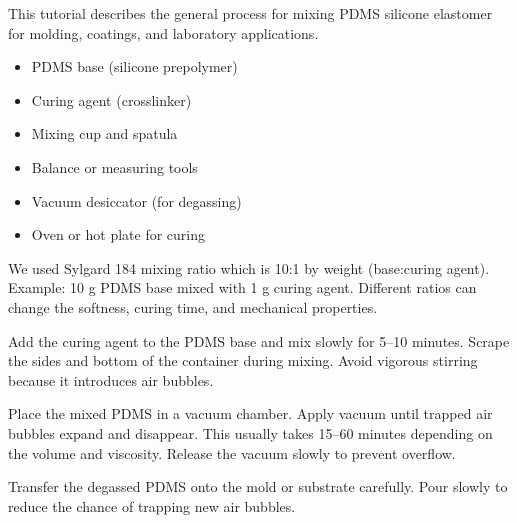 
\clearpage
\hypertarget{q4-pdms-mixing-tutorial}{}

\begingroup
\fontsize{9.0}{10.45}\selectfont
\newcommand{\pdmshead}[1]{\par\vspace{0.48em}{\bfseries #1}\par\vspace{0.15em}}

This tutorial describes the general process for mixing PDMS silicone elastomer
for molding, coatings, and laboratory applications.

\pdmshead{Materials}
\begin{itemize}[leftmargin=1.45em,itemsep=0.15em,topsep=0.25em]
  \item PDMS base (silicone prepolymer)
  \item Curing agent (crosslinker)
  \item Mixing cup and spatula
  \item Balance or measuring tools
  \item Vacuum desiccator (for degassing)
  \item Oven or hot plate for curing
\end{itemize}

\pdmshead{Step 1: Measure the Components}
We used Sylgard 184 mixing ratio which is 10:1 by weight (base:curing agent).
Example: 10 g PDMS base mixed with 1 g curing agent. Different ratios can change
the softness, curing time, and mechanical properties.

\pdmshead{Step 2: Mix Thoroughly}
Add the curing agent to the PDMS base and mix slowly for 5--10 minutes. Scrape
the sides and bottom of the container during mixing. Avoid vigorous stirring
because it introduces air bubbles.

\pdmshead{Step 3: Degas the PDMS}
Place the mixed PDMS in a vacuum chamber. Apply vacuum until trapped air bubbles
expand and disappear. This usually takes 15--60 minutes depending on the volume
and viscosity. Release the vacuum slowly to prevent overflow.

\pdmshead{Step 4: Pour or Coat}
Transfer the degassed PDMS onto the mold or substrate carefully. Pour slowly to
reduce the chance of trapping new air bubbles.

